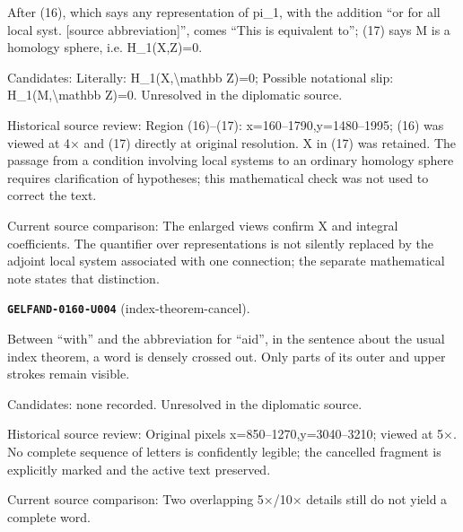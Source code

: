 After (16), which says any representation of pi\_1, with the addition “or for all local syst. [source abbreviation]”, comes “This is equivalent to”; (17) says M is a homology sphere, i.e. H\_1(X,Z)=0.\par
Candidates: Literally: H\_1(X,\textbackslash{}mathbb Z)=0; Possible notational slip: H\_1(M,\textbackslash{}mathbb Z)=0. Unresolved in the diplomatic source.\par
Historical source review: Region (16)–(17): x=160–1790,y=1480–1995; (16) was viewed at 4× and (17) directly at original resolution. X in (17) was retained. The passage from a condition involving local systems to an ordinary homology sphere requires clarification of hypotheses; this mathematical check was not used to correct the text.\par
Current source comparison: The enlarged views confirm X and integral coefficients. The quantifier over representations is not silently replaced by the adjoint local system associated with one connection; the separate mathematical note states that distinction.\par\medskip
\par\noindent\leavevmode{}\label{GELFAND-0160-U004}\label{GELFAND-P001475:index-theorem-cancel}\textbf{\texttt{GELFAND-0160-U004}} (index-theorem-cancel).\nopagebreak[4]\par
Between “with” and the abbreviation for “aid”, in the sentence about the usual index theorem, a word is densely crossed out. Only parts of its outer and upper strokes remain visible.\par
Candidates: none recorded. Unresolved in the diplomatic source.\par
Historical source review: Original pixels x=850–1270,y=3040–3210; viewed at 5×. No complete sequence of letters is confidently legible; the cancelled fragment is explicitly marked and the active text preserved.\par
Current source comparison: Two overlapping 5×/10× details still do not yield a complete word.\par\medskip

